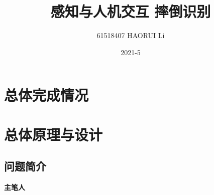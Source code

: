 \documentclass[rnd]{mas_proposal}
\title{感知与人机交互 摔倒识别}
\author{61518407 HAORUI Li}
\date{2021-5}
\begin{document}
\maketitle

\pagestyle{plain}

\section{总体完成情况}




\section{总体原理与设计}

\subsection{问题简介}

\textbf{主笔人}




\nocite{*}

\end{document}
